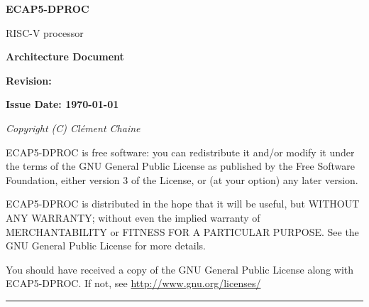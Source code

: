 \begin{titlepage}
    \large{\textbf{ECAP5-DPROC}}

    \vspace{-0.5em}

    \normalsize{RISC-V processor}

    \vspace{1.5em}

    \Huge{\textbf{Architecture Document}}

    \normalsize{\textbf{Revision: \version}}

    \normalsize{\textbf{Issue Date: \today}}

    \vspace*{\fill}

    {\scriptsize \parindent0pt \itshape
    Copyright (C) Clément Chaine

    ECAP5-DPROC is free software: you can redistribute it and/or modify it under the terms of the GNU General Public License as published by the Free Software Foundation, either version 3 of the License, or (at your option) any later version.

    ECAP5-DPROC is distributed in the hope that it will be useful, but WITHOUT ANY WARRANTY; without even the implied warranty of MERCHANTABILITY or FITNESS FOR A PARTICULAR PURPOSE. See the GNU General Public License for more details.

    \vspace{-0.5em}

    You should have received a copy of the GNU General Public License along with ECAP5-DPROC. If not, see \textnormal{\url{http://www.gnu.org/licenses/}}}

    \vspace{1em}

    \par\noindent\rule{\textwidth}{1pt}
  \end{titlepage}

\newpage
